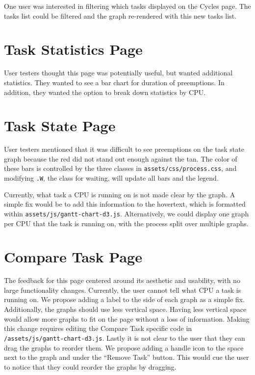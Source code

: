 \documentclass{hmcclinic}
\begin{document}
  One user was interested in filtering which tasks displayed on the Cycles page.
  The tasks list could be filtered and the graph re-rendered with this new tasks
  list.

  \section{Task Statistics Page}

  User testers thought this page was potentially useful, but wanted additional
  statistics. They wanted to see a bar chart for duration of preemptions. In
  addition, they wanted the option to break down statistics by CPU.

  \section{Task State Page}

  User testers mentioned that it was difficult to see preemptions on the 
  task state graph because the red did not stand out enough against the tan. 
  The color of these bars is controlled by the three classes in 
  \texttt{assets/css/process.css}, and modifying \texttt{.W}, the class for 
  waiting, will update all bars and the legend.

  Currently, what task a CPU is running on is not made clear by the graph. 
  A simple fix would be to add this information to the hovertext, which is 
  formatted within \texttt{assets/js/gantt-chart-d3.js}. Alternatively, we 
  could display one graph per CPU that the task is running on, with the 
  process split over multiple graphs.

  \section{Compare Task Page}
  The feedback for this page centered around its aesthetic and usability, with no 
  large functionality changes. Currently, the user cannot tell what CPU a task 
  is running on. We propose adding a label to the side of each graph as a simple 
  fix. Additionally, the graphs should use less vertical space. Having less 
  vertical space would allow more graphs to fit on the page without a loss of 
  information. Making this change requires editing the Compare Task specific 
  code in \texttt{/assets/js/gantt-chart-d3.js}. Lastly it is not clear to the
   user that they can drag the graphs to reorder them. We propose adding a 
   handle icon to the space next to the graph and under the ``Remove Task'' 
   button. This would cue the user to notice that they could reorder the graphs 
   by dragging. 
\end{document}
